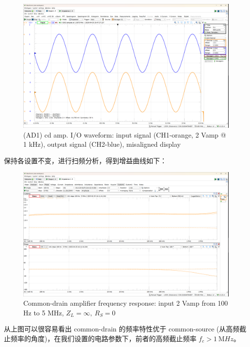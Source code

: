 \documentclass[UTF8]{article}
\begin{document}
\begin{figure}[H]\centering
    \includegraphics[width=\columnwidth]{LCE-04-场效应管/assets/cd amp/cd amp 输入输出波形 (2).png}
    \caption{(AD1) cd amp. I/O waveform: input signal (CH1-orange, 2 Vamp @ 1 kHz), output signal (CH2-blue), misaligned display}
\end{figure}

保持各设置不变，进行扫频分析，得到增益曲线如下：

\begin{figure}[H]\centering
    \includegraphics[width=\columnwidth]{LCE-04-场效应管/assets/cd amp/cd amp frequency response (input 2 Vamp, 100Hz ~ 5MHz).png}
    \caption{Common-drain amplifier frequency response: input 2 Vamp from 100 Hz to 5 MHz, $Z_L = \infty,\ R_S = 0$}
\end{figure}

从上图可以很容易看出 common-drain 的频率特性优于 common-source (从高频截止频率的角度)，在我们设置的电路参数下，前者的高频截止频率 $f_c > 1 \ \mathrm{M}Hz$。
\end{document}
